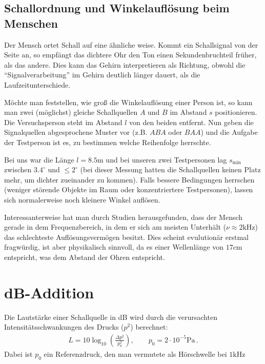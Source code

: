 \documentclass[12pt,a4paper,titlepage,headinclude,bibtotoc]{scrartcl}
\begin{document}
\subsection{Schallordnung und Winkelauflösung beim Menschen}
Der Mensch ortet Schall auf eine ähnliche weise.
Kommt ein Schallsignal von der Seite an, so empfängt das dichtere Ohr den Ton einen Sekundenbruchteil früher, als das andere.
Dies kann das Gehirn interpretieren als Richtung, obwohl die "`Signalverarbeitung"' im Gehirn deutlich länger dauert, als die Laufzeitunterschiede.

Möchte man feststellen, wie groß die Winkelauflösung einer Person ist, so kann man zwei (möglichst) gleiche Schallquellen $A$ und $B$ im Abstand $s$ positionieren.
Die Versuchsperson steht im Abstand $l$ von den beiden entfernt.
Nun geben die Signalquellen abgesprochene Muster vor (z.B. $ABA$ oder $BAA$) und die Aufgabe der Testperson ist es, zu bestimmen welche Reihenfolge herrschte.

Bei uns war die Länge $l=8.5\si\meter$ und bei unseren zwei Testpersonen lag $s_\text{min}$ zwischen $3.4^\circ$ und $\leq2^\circ$ (bei dieser Messung hatten die Schallquellen keinen Platz mehr, um dichter zueinander zu kommen).
Falls bessere Bedingungen herrschen (weniger störende Objekte im Raum oder konzentriertere Testpersonen), lassen sich normalerweise noch kleinere Winkel auflösen.

Interessanterweise hat man durch Studien herausgefunden, dass der Mensch gerade in dem Frequenzbereich, in dem er sich am meisten Unterhält ($\nu\approx2\si{\kilo\hertz}$) das schlechteste Auflösungsvermögen besitzt.
Dies scheint evulutionär erstmal fragwürdig, ist aber physikalisch sinnvoll, da es einer Wellenlänge von $17\si{\centi\meter}$ entspricht, was dem Abstand der Ohren entspricht.


\section{dB-Addition}
Die Lautstärke einer Schallquelle in dB wird durch die verursachten Intensitätsschwankungen des Drucks ($p^2$) berechnet:
\begin{align*}
	L=10\log_{10}\left( \frac{\Delta p^2}{p_0^2} \right), \qquad p_0=2\cdot10^{-5}\si\pascal\, .
\end{align*}
Dabei ist $p_0$ ein Referenzdruck, den man vermutete als Hörschwelle bei $1\si{\kilo\hertz}$







\end{document}
